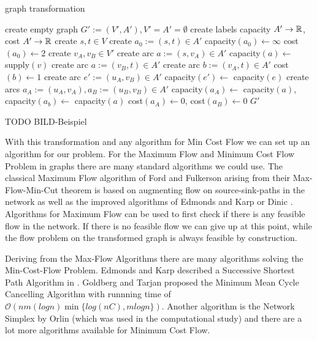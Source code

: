 \begin{algorithm}
 \caption{graph transformation}
 \label{algo:graphtransform}
 \begin{algorithmic}[5]
  \State create empty graph $G':=(V',A'), V'=A'=\emptyset$
  \State create labels capacity $A'\to \mathbb{R}$, cost $A'\to \mathbb{R}$%
  \State create $s, t\in V$ 
  \State create $a_0 :=(s,t) \in A'$
  \State capacity$(a_0)\gets\infty$ 
  \State cost$(a_0)\gets 2$ 
    \State create $v_A, v_B\in V'$
      \State create arc $a:=(s,v_A)\in A'$
      \State capacity$(a)\gets$ supply$(v)$
      \State create arc $a:=(v_B, t)\in A'$
      \State create arc $b:=(v_A,t)\in A'$
      \State cost$(b)\gets 1$
    \EndIf
  \EndFor
      \State create arc $e':=(u_A, v_B)\in A'$
      \State capacity$(e')\gets$ capacity$(e)$
    \Else
      \State create arcs $a_A:=(u_A, v_A), a_B:=(u_B, v_B)\in A'$
      \State capacity$(a_A)\gets$ capacity$(a)$, capacity$(a_b)\gets$ capacity$(a)$
      \State cost$(a_A)\gets 0$, cost$(a_B)\gets0$
    \EndIf
  \EndFor
  \Return $G'$
  \EndFunction
 \end{algorithmic}

\end{algorithm}

TODO BILD-Beispiel 

With this transformation and any algorithm for Min Cost Flow we can set up an algorithm for our problem. 
For the Maximum Flow and Minimum Cost Flow Problem in graphs there are many standard algorithms we could use. The 
classical Maximum Flow algorithm of Ford and Fulkerson \cite{Ford-Fulkerson_algo} arising from their Max-Flow-Min-Cut 
theorem is based on augmenting flow on source-sink-paths in the network as well as the improved algorithms of Edmonds 
and Karp \cite{EdmondsKarp1972} or Dinic \cite{Dinic1970}. Algorithms for Maximum Flow can be used to first check if 
there is any feasible flow in the network. If there is no feasible flow we can give up at this point, while the flow 
problem on the transformed graph is always feasible by construction.

Deriving from the Max-Flow Algorithms there are many algorithms solving the Min-Cost-Flow Problem. Edmonds and 
Karp described a Successive Shortest Path Algorithm in \cite{EdmondsKarp1972}. Goldberg and Tarjan proposed the Minimum 
Mean Cycle Cancelling Algorithm \cite{minMeanCycleCancelling89} with runnning time of $\mathcal{O}(nm(log 
n)\min\{log(nC), m log n\}) $.
Another algorithm is the Network Simplex by Orlin \cite{NetworkSimplexOrlin97} (which was used in the computational 
study) and there are a lot more algorithms available for Minimum Cost Flow.

